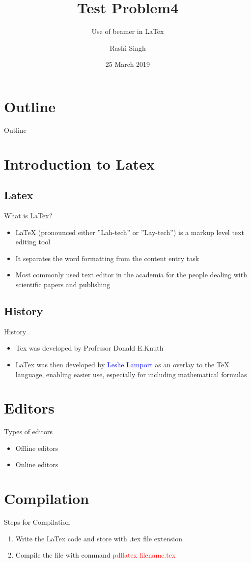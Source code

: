 \documentclass{beamer}
\title{Test Problem4}
\author{Rashi Singh}
\subtitle{Use of beamer in LaTex}
\institute{Indian Institute of Technology Guwahati \\
	Assam, India.}
\date{25 March 2019}
\begin{document}
\maketitle
\section*{Outline}
\begin{frame}{Outline}
\tableofcontents
\end{frame}
\section{Introduction to Latex}
\subsection{Latex}
\begin{frame}{What is LaTex?}
\begin{itemize}
	\item LaTeX (pronounced either ”Lah-tech” or ”Lay-tech”) is a markup level text editing tool
	\item It separates the word formatting from the content entry task
	\item Most commonly used text editor in the academia for the people dealing with scientific papers and publishing
\end{itemize}
\end{frame}
\subsection{History}
\begin{frame}{History}
\begin{itemize}
	\item Tex was developed by Professor Donald E.Knuth
	\item LaTex was then developed by \textcolor{blue}{Leslie Lamport} as an overlay to the TeX language, enabling easier use, especially for including mathematical formulas
\end{itemize}
\end{frame}

\section{Editors}
\begin{frame}{Types of editors}
\begin{itemize}
	\item Offline editors
	\item Online editors
\end{itemize}
\end{frame}

\section{Compilation}
\begin{frame}{Steps for Compilation}
\begin{enumerate}
	\item Write the LaTex code and store with .tex file extension
	\item Compile the file with command \textcolor{red}{pdflatex filename.tex}
\end{enumerate}
\end{frame}
\end{document}
